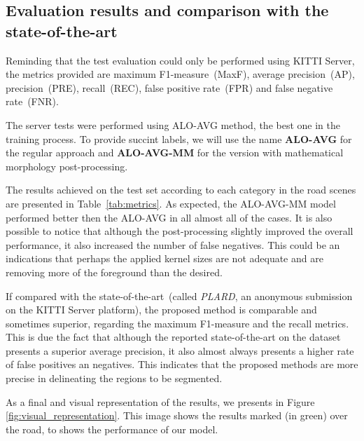 \subsection{Evaluation results and comparison with the state-of-the-art}

Reminding that the test evaluation could only be performed using KITTI Server, the metrics provided are maximum F1-measure~(MaxF), average precision~(AP), precision~(PRE), recall~(REC), false positive rate~(FPR) and false negative rate~(FNR). 

The server tests were performed using ALO-AVG method, the best one in the training process. To provide succint labels, we will use the name \textbf{ALO-AVG} for the regular approach and \textbf{ALO-AVG-MM} for the version with mathematical morphology post-processing. 

The results achieved  on the test set according to each category in the road scenes are presented in Table~\ref{tab:metrics}. As expected, the ALO-AVG-MM model performed better then the ALO-AVG in all almost all of the cases. {\color{red}It is also possible to notice that although the post-processing slightly improved the overall performance, it also increased the number of false negatives. This could be an indications that perhaps the applied kernel sizes are not adequate and are removing more of the foreground than the desired.}

If compared with the state-of-the-art~(called \textit{PLARD}, an anonymous submission on the KITTI Server platform), the proposed method is comparable and sometimes superior, regarding the maximum F1-measure and the recall metrics. This is due the fact that although the reported state-of-the-art on the dataset presents a superior average precision, it also almost always presents a higher rate of false positives an negatives. This indicates that the proposed methods are more precise in delineating the regions to be segmented.



As a final and visual representation of the results, we presents in Figure \ref{fig:visual_representation}. This image shows the results marked (in green) over the road, to shows the performance of our model.

